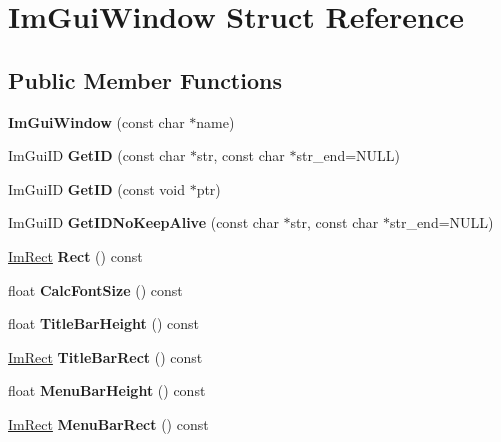\hypertarget{struct_im_gui_window}{}\section{Im\+Gui\+Window Struct Reference}
\label{struct_im_gui_window}
\subsection*{Public Member Functions}
\begin{DoxyCompactItemize}
\item 
\mbox{\label{struct_im_gui_window_abbc943558e96c8895237f0b55a66751b}} 
{\bfseries Im\+Gui\+Window} (const char $\ast$name)
\item 
\mbox{\label{struct_im_gui_window_a66400a63bc0b54d7d29e08d1b1b1a42b}} 
Im\+Gui\+ID {\bfseries Get\+ID} (const char $\ast$str, const char $\ast$str\+\_\+end=N\+U\+LL)
\item 
\mbox{\label{struct_im_gui_window_aae21dffb343cabca9414499b827912a8}} 
Im\+Gui\+ID {\bfseries Get\+ID} (const void $\ast$ptr)
\item 
\mbox{\label{struct_im_gui_window_adc0a43f74a0b53a15a4bc4fea05524fe}} 
Im\+Gui\+ID {\bfseries Get\+I\+D\+No\+Keep\+Alive} (const char $\ast$str, const char $\ast$str\+\_\+end=N\+U\+LL)
\item 
\mbox{\label{struct_im_gui_window_a147da28bf5d167cbe0a363c4a578dea1}} 
\hyperlink{struct_im_rect}{Im\+Rect} {\bfseries Rect} () const
\item 
\mbox{\label{struct_im_gui_window_a6881ed65e208fb6e015d3ae6bccfc794}} 
float {\bfseries Calc\+Font\+Size} () const
\item 
\mbox{\label{struct_im_gui_window_ad1580cc8b5bdf981c6ed2eb22ecd7dbb}} 
float {\bfseries Title\+Bar\+Height} () const
\item 
\mbox{\label{struct_im_gui_window_a06884e1bc80e460e51e1626b5b976196}} 
\hyperlink{struct_im_rect}{Im\+Rect} {\bfseries Title\+Bar\+Rect} () const
\item 
\mbox{\label{struct_im_gui_window_acfb8bdad2e3ea6102589813ae32d0364}} 
float {\bfseries Menu\+Bar\+Height} () const
\item 
\mbox{\label{struct_im_gui_window_a59df76c1445aaaf0b43456c83c1a88e5}} 
\hyperlink{struct_im_rect}{Im\+Rect} {\bfseries Menu\+Bar\+Rect} () const
\end{DoxyCompactItemize}
